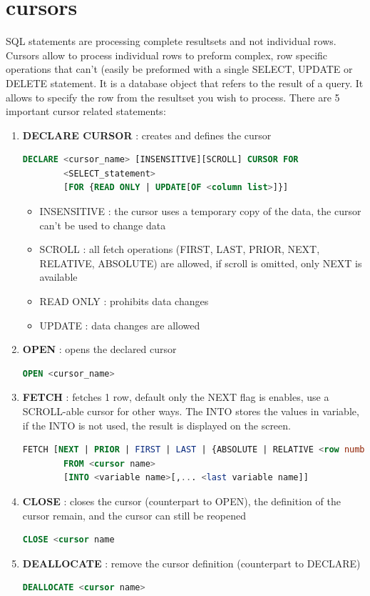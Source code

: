 \documentclass{report}
\begin{document}
	\section{cursors}
	SQL statements are processing complete resultsets and not individual rows. Cursors allow to process individual rows to preform complex, row specific operations that can't (easily be preformed with a single SELECT, UPDATE or DELETE statement. It is a database object that refers to the result of a query. It allows to specify the row from the resultset you wish to process.
	There are 5 important cursor related statements: 
	\begin{enumerate}
		\item \textbf{DECLARE CURSOR} : creates and defines the cursor
		\begin{lstlisting}[language = sql]
		DECLARE <cursor_name> [INSENSITIVE][SCROLL] CURSOR FOR
		<SELECT_statement> 
		[FOR {READ ONLY | UPDATE[OF <column list>]}]\end{lstlisting}
		\begin{itemize}
			\item INSENSITIVE : the cursor uses a temporary copy of the data, the cursor can't be used to change data 
			\item SCROLL : all fetch operations (FIRST, LAST, PRIOR, NEXT, RELATIVE, ABSOLUTE) are allowed, if scroll is omitted, only NEXT is available
			\item READ ONLY : prohibits data changes 
			\item UPDATE : data changes are allowed
		\end{itemize}
		\item \textbf{OPEN} : opens the declared cursor
		\begin{lstlisting}[language = sql]
		OPEN <cursor_name>\end{lstlisting}
		\item \textbf{FETCH} : fetches 1 row, default only the NEXT flag is enables, use a SCROLL-able cursor for other ways. The INTO stores the values in variable, if the INTO is not used, the result is displayed on the screen.
		\begin{lstlisting}[language = sql]
		FETCH [NEXT | PRIOR | FIRST | LAST | {ABSOLUTE | RELATIVE <row number>}]
		FROM <cursor name>
		[INTO <variable name>[,... <last variable name]]	\end{lstlisting}
		\item \textbf{CLOSE} : closes the cursor (counterpart to OPEN), the definition of the cursor remain, and the cursor can still be reopened
		\begin{lstlisting}[language = sql]
		CLOSE <cursor name	\end{lstlisting}		
		\item \textbf{DEALLOCATE} : remove the cursor definition (counterpart to DECLARE)
		\begin{lstlisting}[language = sql]
		DEALLOCATE <cursor name> \end{lstlisting}		
	\end{enumerate}
\end{document}
